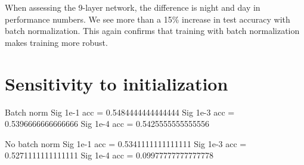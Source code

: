 \documentclass[11pt,a4paper]{article}
\begin{document}
When assessing the 9-layer network, the difference is night and day in performance numbers. We see more than a 15\% increase in test accuracy with batch normalization. This again confirms that training with batch normalization makes training more robust.

\section{Sensitivity to initialization}


Batch norm
Sig 1e-1 acc = 0.5484444444444444
Sig 1e-3 acc = 0.5396666666666666
Sig 1e-4 acc = 0.5425555555555556

No batch norm
Sig 1e-1 acc = 0.5341111111111111
Sig 1e-3 acc = 0.5271111111111111
Sig 1e-4 acc = 0.09977777777777778
\end{document}
